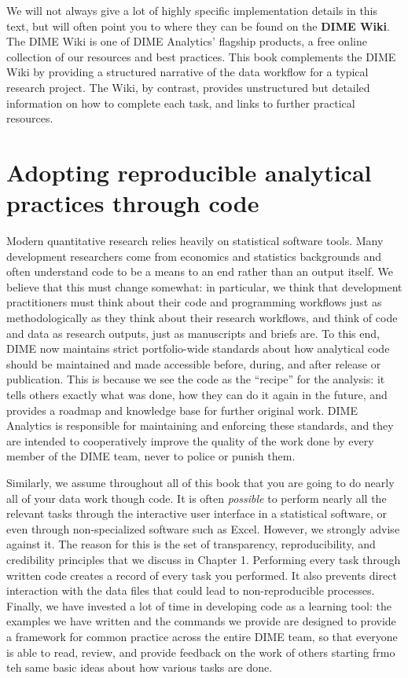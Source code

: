 We will not always give a lot of highly specific implementation details in this text,
but will often point you to where they can be found on the \textbf{DIME Wiki}.
The DIME Wiki is one of DIME Analytics' flagship products,
a free online collection of our resources and best practices.
This book complements the DIME Wiki by providing a structured narrative
of the data workflow for a typical research project.
The Wiki, by contrast, provides unstructured but detailed information
on how to complete each task, and links to further practical resources.

\section{Adopting reproducible analytical practices through code}

Modern quantitative research relies heavily on statistical software tools.
Many development researchers come from economics and statistics backgrounds
and often understand code to be a means to an end rather than an output itself.
We believe that this must change somewhat:
in particular, we think that development practitioners
must think about their code and programming workflows
just as methodologically as they think about their research workflows,
and think of code and data as research outputs, just as manuscripts and briefs are.
To this end, DIME now maintains strict portfolio-wide standards
about how analytical code should be maintained and made accessible
before, during, and after release or publication.
This is because we see the code as the ``recipe'' for the analysis:
it tells others exactly what was done,
how they can do it again in the future,
and provides a roadmap and knowledge base for further original work.
DIME Analytics is responsible for maintaining and enforcing these standards,
and they are intended to cooperatively improve the quality of the work done by
every member of the DIME team, never to police or punish them.

Similarly, we assume throughout all of this book
that you are going to do nearly all of your data work though code.
It is often \textit{possible} to perform nearly all the relevant tasks
through the interactive user interface in a statistical software,
or even through non-specialized software such as Excel.
However, we strongly advise against it.
The reason for this is the set of
transparency, reproducibility, and credibility principles
that we discuss in Chapter 1.
Performing every task through written code
creates a record of every task you performed.
It also prevents direct interaction
with the data files that could lead to non-reproducible processes.
Finally, we have invested a lot of time in developing code as a learning tool:
the examples we have written and the commands we provide
are designed to provide a framework for common practice
across the entire DIME team, so that everyone is able to
read, review, and provide feedback on the work of others
starting frmo teh same basic ideas about how various tasks are done.

